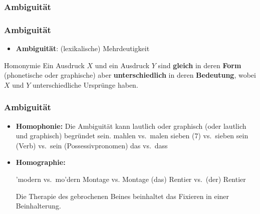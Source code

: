 %
\subsubsection{Ambiguität}
%

\begin{frame}
\frametitle{Ambiguität}

\begin{itemize}
	\item \textbf{Ambiguität}: (lexikalische) Mehrdeutigkeit
\end{itemize}	

	
\begin{block}{Homonymie}
Ein Ausdruck $X$ und ein Ausdruck $Y$ sind \textbf{gleich} in deren \textbf{Form} (phonetische oder graphische) aber \textbf{unterschiedlich} in deren \textbf{Bedeutung}, wobei $X$ und $Y$ unterschiedliche Ursprünge haben.
\end{block}

\nocite{MyP18n} %

\end{frame}


\begin{frame}
\frametitle{Ambiguität}


\begin{itemize}
	\item \textbf{Homophonie:}
	Die Ambiguität kann lautlich oder graphisch (oder lautlich und graphisch) begründet sein.
	\eal
	\ex mahlen vs.\ malen 
	\ex sieben (7) vs.\ sieben
	\ex sein (Verb) vs.\ sein (Possessivpronomen)
	\ex das vs.\ dass
	\zl
	
	\item \textbf{Homographie:}
			
	\eal 
	\ex 'modern vs.\ mo'dern
	\ex Montage vs. Montage
	\ex (das) Rentier vs.\ (der) Rentier 

\pause 
	
	\ex Die Therapie des gebrochenen Beines beinhaltet das Fixieren in einer Beinhalterung.
	\zl
	
\end{itemize}
	
\end{frame}


